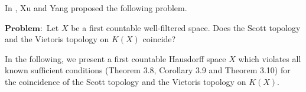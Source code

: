 \documentclass[preprint,12pt]{elsarticle}
\numberwithin{equation}{section}
\begin{document}




In \cite{EEF30}, Xu and Yang proposed the following problem.

\vspace*{0.2cm}
$\mathbf{Problem:}$ Let $X$ be a first countable well-filtered space. Does the Scott topology and the Vietoris topology on $K(X)$ coincide?
\vspace*{0.2cm}

In the following, we present  a first countable Hausdorff space $X$ which violates all known sufficient conditions (Theorem 3.8, Corollary 3.9 and Theorem 3.10) for the coincidence of the Scott topology and the Vietoris topology on $K(X)$.
\end{document}
